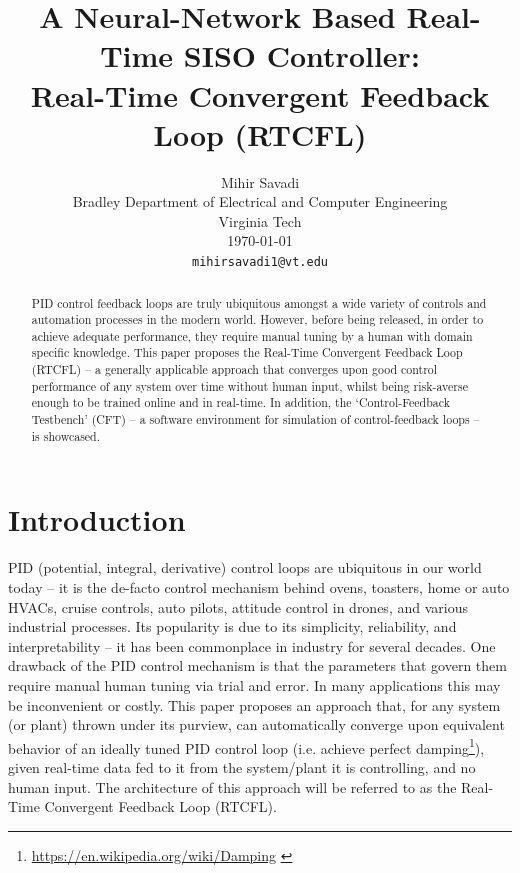 \documentclass[10pt,twocolumn,letterpaper]{article}
\begin{document}
    \title{A Neural-Network Based Real-Time SISO Controller:\\Real-Time Convergent Feedback Loop (RTCFL)}

    \author{Mihir Savadi\\
    Bradley Department of Electrical and Computer Engineering\\
    Virginia Tech\\ \today\\
    {\tt\small mihirsavadi1@vt.edu} }

    \maketitle
    \thispagestyle{empty}

    \begin{abstract} 
        PID control feedback loops are truly ubiquitous amongst a wide variety of controls and automation processes in
        the modern world. However, before being released, in order to achieve adequate performance, they require manual
        tuning by a human with domain specific knowledge. This paper proposes the Real-Time Convergent Feedback Loop
        (RTCFL) -- a generally applicable approach that converges upon good control performance of any system over time
        without human input, whilst being risk-averse enough to be trained online and in real-time. In addition, the
        `Control-Feedback Testbench' (CFT) -- a software environment for simulation of control-feedback loops -- is
        showcased\cite{gitrepo}.
    \end{abstract}
    \tableofcontents

    \section{Introduction} \label{intro}

        PID (potential, integral, derivative) control loops are ubiquitous in our world today -- it is the de-facto
        control mechanism behind ovens, toasters, home or auto HVACs, cruise controls, auto pilots, attitude control in
        drones, and various industrial processes. Its popularity is due to its simplicity, reliability, and
        interpretability -- it has been commonplace in industry for several decades. One drawback of the PID control
        mechanism is that the parameters that govern them require manual human tuning via trial and error. In many
        applications this may be inconvenient or costly. This paper proposes an approach that, for any system (or plant)
        thrown under its purview, can automatically converge upon equivalent behavior of an ideally tuned PID control
        loop (i.e. achieve perfect damping\footnote{\url{https://en.wikipedia.org/wiki/Damping} \label{wikidamp}}),
        given real-time data fed to it from the system/plant it is controlling, and no human input. The architecture of
        this approach will be referred to as the Real-Time Convergent Feedback Loop (RTCFL).
\end{document}
